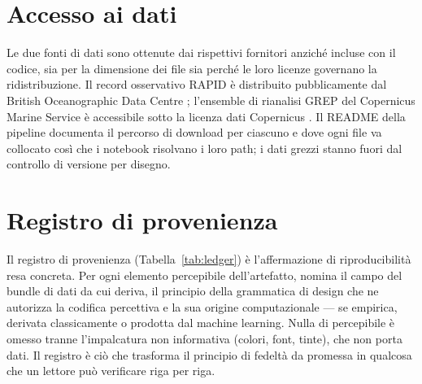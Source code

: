 \section{Accesso ai dati}
\label{app:c-data}

Le due fonti di dati sono ottenute dai rispettivi fornitori anziché incluse con il codice, sia per la
dimensione dei file sia perché le loro licenze governano la ridistribuzione. Il record osservativo
RAPID è distribuito pubblicamente dal British Oceanographic Data Centre \citep{moat2026}; l'ensemble
di rianalisi GREP del Copernicus Marine Service è accessibile sotto la licenza dati Copernicus
\citep{copernicus_grep}. Il README della pipeline documenta il percorso di download per ciascuno e
dove ogni file va collocato così che i notebook risolvano i loro path; i dati grezzi stanno fuori dal
controllo di versione per disegno.

\section{Registro di provenienza}
\label{app:c-ledger}

Il registro di provenienza (Tabella~\ref{tab:ledger}) è l'affermazione di riproducibilità resa
concreta. Per ogni elemento percepibile dell'artefatto, nomina il campo del bundle di dati da cui
deriva, il principio della grammatica di design che ne autorizza la codifica percettiva e la sua
origine computazionale --- se empirica, derivata classicamente o prodotta dal machine learning. Nulla
di percepibile è omesso tranne l'impalcatura non informativa (colori, font, tinte), che non porta
dati. Il registro è ciò che trasforma il principio di fedeltà da promessa in qualcosa che un lettore
può verificare riga per riga.


